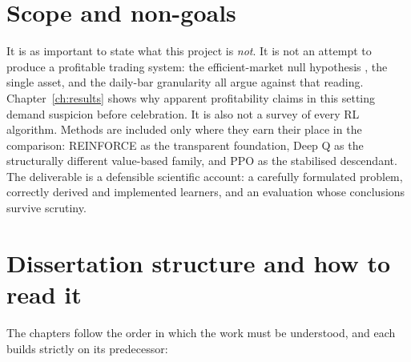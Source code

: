 \section{Scope and non-goals}
\label{sec:intro_scope}

It is as important to state what this project is \emph{not}. It is not an
attempt to produce a profitable trading system: the efficient-market
null hypothesis \cite{fama1970}, the single asset, and the daily-bar
granularity all argue against that reading. Chapter~\ref{ch:results}
shows why apparent profitability claims in this setting demand suspicion
before celebration. It is also not a survey of every RL algorithm.
Methods are included only where they earn their place in the comparison:
REINFORCE as the transparent foundation, Deep Q as the structurally
different value-based family, and PPO as the stabilised descendant. The deliverable is a defensible scientific account: a
carefully formulated problem, correctly derived and implemented learners,
and an evaluation whose conclusions survive scrutiny.

\section{Dissertation structure and how to read it}
\label{sec:intro_structure}

The chapters follow the order in which the work must be understood, and
each builds strictly on its predecessor:

